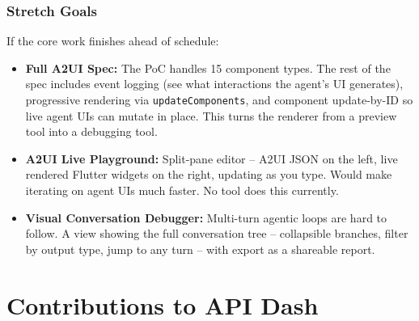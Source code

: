 \documentclass[11pt,a4paper]{article}
\begin{document}
\subsubsection{Stretch Goals}

If the core work finishes ahead of schedule:

\begin{itemize}[itemsep=6pt]
  \item \textbf{Full A2UI Spec:} The PoC handles 15 component types. The rest of the spec includes event logging (see what interactions the agent's UI generates), progressive rendering via \texttt{updateComponents}, and component update-by-ID so live agent UIs can mutate in place. This turns the renderer from a preview tool into a debugging tool.
  \item \textbf{A2UI Live Playground:} Split-pane editor -- A2UI JSON on the left, live rendered Flutter widgets on the right, updating as you type. Would make iterating on agent UIs much faster. No tool does this currently.
  \item \textbf{Visual Conversation Debugger:} Multi-turn agentic loops are hard to follow. A view showing the full conversation tree -- collapsible branches, filter by output type, jump to any turn -- with export as a shareable report.
\end{itemize}

\newpage

\section{Contributions to API Dash}\label{sec:contributions}
\end{document}
